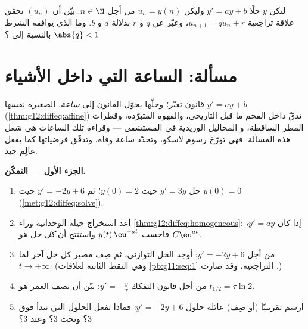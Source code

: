 \begin{exercise}[$\star\star\star$]\label{exo:g12:diffeq:9}
لتكن $y$ حلًا  $y' = ay + b$ وليكن $u_n = y(n)$ من أجل $n \in \N$.
بيّن أن $(u_n)$ تحقق علاقة تراجعية  
$u_{n+1} = q u_n + r$، وعبّر عن $q$ و $r$ بدلالة $a$ و $b$. وما الذي
يوافقه الشرط $\abs{q} < 1$ بالنسبة إلى ؟
\end{exercise}

\section{مسألة: الساعة التي داخل الأشياء}

\begin{problem}
\label{pb:g12:diffeq:1}
 قانون تغيّر؛ وحلّها يحوّل
القانون إلى \emph{ساعة}.  الصغيرة نفسها
$y' = ay + b$ (\cref{thm:g12:diffeq:affine}) تدقّ داخل
الفحم ما قبل التاريخي، والقهوة المتبرّدة، وقطرات المطر الساقطة، و
المحاليل الوريدية في المستشفى --- وقراءة تلك الساعات هي شغل هذه
المسألة: فهي تؤرّخ رسوم لاسكو، وتحدّد ساعة وفاة،
وتدقّق فرضياتها كما يفعل عالِم جيد.

\medskip
\noindent\textbf{الجزء الأول --- التمكّن.}
\begin{enumerate}
  \item حل $y' = 3y$ حيث $y(0) = 2$؛ ثم
        $y' = -2y + 6$ حيث $y(0) = 0$
        (\cref{met:g12:diffeq:solve}).
  \item أعد استخراج حيلة الوحدانية وراء
        \cref{thm:g12:diffeq:homogeneous}: إذا كان $y' = ay$، فاحسب
         $y(t)\,\eu^{-at}$ واستنتج أن
        \emph{كل} حل هو $C\eu^{at}$.
  \item من أجل $y' = -2y + 6$: أوجد الحل التوازني، ثم
        صِف مصير كل حل آخر لما
        $t \to +\infty$. (وهي النقط الثابتة لعلاقات
        \cref{pb:g11:seq:1} التراجعية، وقد صارت .)
  \item من أجل قانون التفكك $y' = -\frac{y}{\tau}$: بيّن أن
        نصف العمر هو $t_{1/2} = \tau \ln 2$.
  \item ارسم تقريبيًا (أو صِف) عائلة حلول
        $y' = -2y + 6$: فماذا تفعل الحلول التي تبدأ فوق $3$؟
        وتحت $3$؟ وعند $3$؟
\end{enumerate}


\end{problem}
